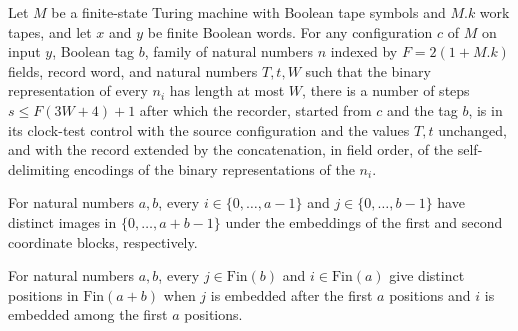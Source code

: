 \begin{lemma}
\label{Complexity.clRec_copy}
\leanok
{}
Let $M$ be a finite-state Turing machine with Boolean tape symbols and $M.k$ work tapes,
and let $x$ and $y$ be finite Boolean words. For any configuration $c$ of $M$ on input
$y$, Boolean tag $b$, family of natural numbers $n$ indexed by $F=2(1+M.k)$ fields,
record word, and natural numbers $T,t,W$ such that the binary representation of every
$n_i$ has length at most $W$, there is a number of steps $s\le F(3W+4)+1$ after which
the recorder, started from $c$ and the tag $b$, is in its clock-test control with the
source configuration and the values $T,t$ unchanged, and with the record extended by the
concatenation, in field order, of the self-delimiting encodings of the binary
representations of the $n_i$.
\end{lemma}

\begin{lemma}
\label{Complexity.clLeft_ne_right}
\leanok
{}
For natural numbers $a,b$, every $i\in\{0,\ldots,a-1\}$ and $j\in\{0,\ldots,b-1\}$ have
distinct images in $\{0,\ldots,a+b-1\}$ under the embeddings of the first and second
coordinate blocks, respectively.
\end{lemma}

\begin{lemma}
\label{Complexity.clRight_ne_left}
\leanok
{}
For natural numbers $a,b$, every $j\in\mathrm{Fin}(b)$ and $i\in\mathrm{Fin}(a)$ give
distinct positions in $\mathrm{Fin}(a+b)$ when $j$ is embedded after the first $a$
positions and $i$ is embedded among the first $a$ positions.
\end{lemma}

